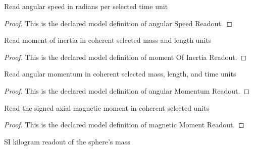 \begin{definition}
  \label{def:physics:phyx-mini-0563:phyxminiproblems-problemphyxmini0563-angularspeedreadout}
  Read angular speed in radians per selected time unit
\end{definition}
\begin{proof}
  This is the declared model definition of angular Speed Readout.
\end{proof}
\begin{definition}
  \label{def:physics:phyx-mini-0563:phyxminiproblems-problemphyxmini0563-momentofinertiareadout}
  Read moment of inertia in coherent selected mass and length units
\end{definition}
\begin{proof}
  This is the declared model definition of moment Of Inertia Readout.
\end{proof}
\begin{definition}
  \label{def:physics:phyx-mini-0563:phyxminiproblems-problemphyxmini0563-angularmomentumreadout}
  Read angular momentum in coherent selected mass, length, and time units
\end{definition}
\begin{proof}
  This is the declared model definition of angular Momentum Readout.
\end{proof}
\begin{definition}
  \label{def:physics:phyx-mini-0563:phyxminiproblems-problemphyxmini0563-magneticmomentreadout}
  Read the signed axial magnetic moment in coherent selected units
\end{definition}
\begin{proof}
  This is the declared model definition of magnetic Moment Readout.
\end{proof}
\begin{definition}
  \label{def:physics:phyx-mini-0563:phyxminiproblems-problemphyxmini0563-massinkilograms}
  SI kilogram readout of the sphere's mass
\end{definition}

